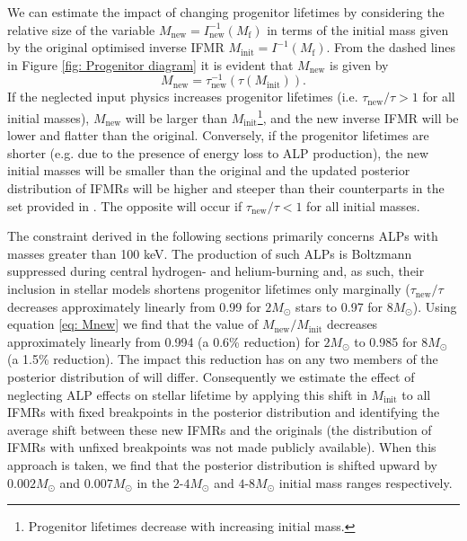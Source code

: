 We can estimate the impact of changing progenitor lifetimes by considering the relative size of the variable $M_{\mathrm{new}}=I_{\mathrm{new}}^{-1}(M_{\mathrm{f}})$ in terms of the initial mass given by the original optimised inverse IFMR $M_{\mathrm{init}}=I^{-1}(M_{\mathrm{f}})$. From the dashed lines in Figure \ref{fig: Progenitor diagram} it is evident that $M_{\mathrm{new}}$ is given by
\begin{equation}
    M_{\mathrm{new}}=\tau_{\mathrm{new}}^{-1}(\tau(M_{\mathrm{init}})).
    \label{eq: Mnew}
\end{equation}
If the neglected input physics increases progenitor lifetimes (i.e. $\tau_{\mathrm{new}}/\tau>1$ for all initial masses), $M_{\mathrm{new}}$ will be larger than $M_{\mathrm{init}}$\footnote{Progenitor lifetimes decrease with increasing initial mass.}, and the new inverse IFMR will be lower and flatter than the original. Conversely, if the progenitor lifetimes are shorter (e.g. due to the presence of energy loss to ALP production), the new initial masses will be smaller than the original and the updated posterior distribution of IFMRs will be higher and steeper than their counterparts in the set provided in \cite{Andrews}. The opposite will occur if $\tau_{\mathrm{new}}/\tau<1$ for all initial masses.


The constraint derived in the following sections primarily concerns ALPs with masses greater than 100 keV. The production of such ALPs is Boltzmann suppressed during central hydrogen- and helium-burning and, as such, their inclusion in stellar models shortens progenitor lifetimes only marginally ($\tau_{\mathrm{new}}/\tau$ decreases approximately linearly from 0.99 for $2M_{\odot}$ stars to 0.97 for $8M_{\odot}$). Using equation \ref{eq: Mnew} we find that the value of $M_{\mathrm{new}}/M_{\mathrm{init}}$ decreases approximately linearly from 0.994 (a 0.6\% reduction) for $2M_{\odot}$ to 0.985 for $8M_{\odot}$ (a 1.5\% reduction). The impact this reduction has on any two members of the posterior distribution of \cite{Andrews} will differ. Consequently we estimate the effect of neglecting ALP effects on stellar lifetime by applying this shift in $M_{\mathrm{init}}$ to all IFMRs with fixed breakpoints in the posterior distribution and identifying the average shift between these new IFMRs and the originals (the distribution of IFMRs with unfixed breakpoints was not made publicly available). When this approach is taken, we find that the posterior distribution is shifted upward by $0.002M_{\odot}$ and $0.007M_{\odot}$ in the $2$-$4M_{\odot}$ and $4$-$8M_{\odot}$ initial mass ranges respectively. 

